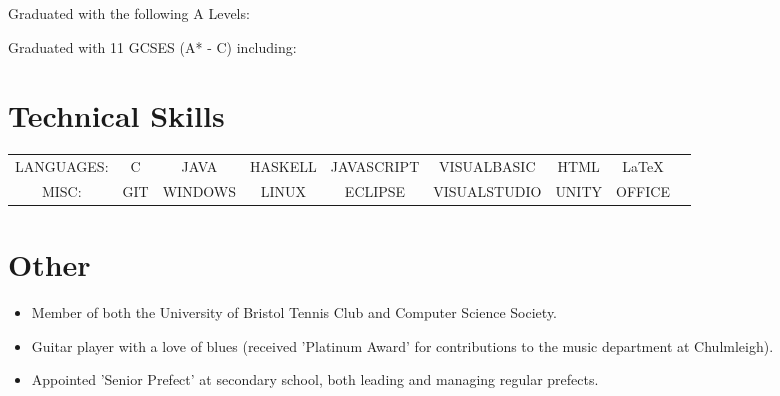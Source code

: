 \documentclass{cvclass}
\begin{document}
\newline
{}\newline
{}
Graduated with the following A Levels: \newline

Graduated with 11 GCSES (A* - C) including:\newline

\section{Technical Skills}
\begin{tabular}{ c c c c c c c c c }
  LANGUAGES: & C & JAVA & HASKELL & JAVASCRIPT & VISUALBASIC & HTML & \LaTeX\\
  MISC: & GIT & WINDOWS & LINUX & ECLIPSE & VISUALSTUDIO & UNITY & OFFICE &
\end{tabular}\newline

\section{Other}
\begin{itemize}
  \item Member of both the University of Bristol Tennis Club and Computer Science Society.
  \item  Guitar player with a love of blues (received 'Platinum Award' for contributions to the music department at Chulmleigh).
  \item Appointed 'Senior Prefect' at secondary school, both leading and managing regular prefects.
\end{itemize}
\end{document}
